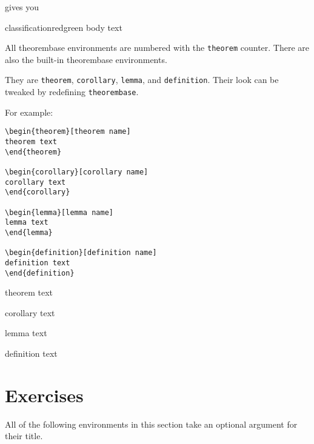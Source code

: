 \documentclass{article}
\begin{document}
gives you

\begin{theorembase}[name]{classification}{red}{green}
body text
\end{theorembase}

All theorembase environments are numbered with the \texttt{theorem} counter.
There are also the built-in theorembase environments.


They are \texttt{theorem}, \texttt{corollary}, \texttt{lemma}, and \texttt{definition}.
Their look can be tweaked by redefining \texttt{theorembase}.

For example:

\begin{verbatim}
\begin{theorem}[theorem name]
theorem text
\end{theorem}

\begin{corollary}[corollary name]
corollary text
\end{corollary}

\begin{lemma}[lemma name]
lemma text
\end{lemma}

\begin{definition}[definition name]
definition text
\end{definition}
\end{verbatim}

\begin{theorem}
theorem text
\end{theorem}

\begin{corollary}
corollary text
\end{corollary}

\begin{lemma}
lemma text
\end{lemma}

\begin{definition}
definition text
\end{definition}

\section{Exercises}

All of the following environments in this section take an optional argument for their title.
\end{document}
